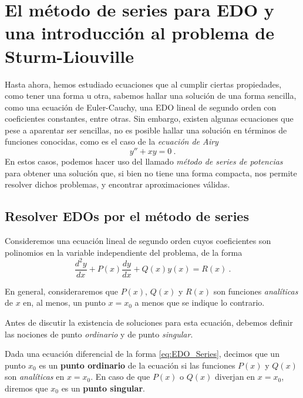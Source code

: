 \chapter{El método de series para EDO y una introducción al problema de Sturm-Liouville}

Hasta ahora, hemos estudiado ecuaciones que al cumplir ciertas propiedades, como tener una forma u otra, sabemos hallar una solución de una forma sencilla, como una ecuación de Euler-Cauchy, una EDO lineal de segundo orden con coeficientes constantes, entre otras. Sin embargo, existen algunas ecuaciones que pese a aparentar ser sencillas, no es posible hallar una solución en términos de funciones conocidas, como es el caso de la \emph{ecuación de Airy}
\begin{equation}
    y'' + xy = 0 \ .
\end{equation}
En estos casos, podemos hacer uso del llamado \emph{método de series de potencias} para obtener una solución que, si bien no tiene una forma compacta, nos permite resolver dichos problemas, y encontrar aproximaciones válidas.

\section{Resolver EDOs por el método de series}

Consideremos una ecuación lineal de segundo orden cuyos coeficientes son polinomios en la variable independiente del problema, de la forma
\begin{equation} \label{eq:EDO_Series}
    \frac{d^2 y}{dx} + P(x) \frac{dy}{dx} + Q(x) y(x) = R(x) \ .
\end{equation}

En general, consideraremos que $P(x)$, $Q(x)$ y $R(x)$ son funciones \emph{analíticas} de $x$ en, al menos, un punto $x=x_0$ a menos que se indique lo contrario.

Antes de discutir la existencia de soluciones para esta ecuación, debemos definir las nociones de punto \emph{ordinario} y de punto \emph{singular}.

\begin{defi}
    Dada una ecuación diferencial de la forma \eqref{eq:EDO_Series}, decimos que un punto $x_0$ es un \textbf{punto ordinario} de la ecuación si las funciones $P(x)$ y $Q(x)$ son \emph{analíticas} en $x=x_0$. En caso de que $P(x)$ o $Q(x)$ diverjan en $x = x_0$, diremos que $x_0$ es un \textbf{punto singular}. 
\end{defi}

